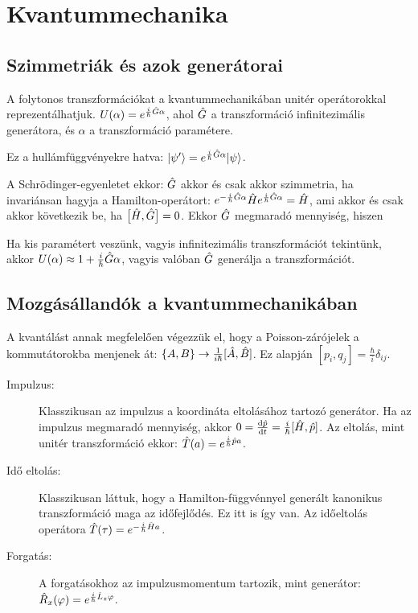 \section{Kvantummechanika}
   
  \subsection{Szimmetriák és azok generátorai}
   
   A folytonos transzformációkat a kvantummechanikában unitér operátorokkal reprezentálhatjuk. $U(\alpha)=e^{\frac{i}{\hbar}\hat{G}\alpha}$, ahol $\hat{G}$ a transzformáció infinitezimális generátora, és $\alpha$ a transzformáció paramétere. 
   
   Ez a hullámfüggvényekre hatva: $\lvert\psi'\rangle=e^{\frac{i}{\hbar}\hat{G}\alpha}\lvert\psi\rangle$. 
   
   A Schrödinger-egyenletet ekkor:
   $\hat{G}$ akkor és csak akkor szimmetria, ha invariánsan hagyja a Hamilton-operátort: $e^{-\frac{i}{\hbar}\hat{G}\alpha}\hat{H} e^{\frac{i}{\hbar}\hat{G}\alpha}=\hat{H}$, ami akkor és csak akkor következik be, ha $\big[\hat{H},\hat{G}\big]=0$. Ekkor $\hat{G}$ megmaradó mennyiség, hiszen
   
   Ha kis paramétert veszünk, vagyis infinitezimális transzformációt tekintünk, akkor $U(\alpha)\approx 1+\frac{i}{\hbar}\hat{G}\alpha$, vagyis valóban $\hat{G}$ generálja a transzformációt. 
   
  \subsection{Mozgásállandók a kvantummechanikában}
   A kvantálást annak megfelelően végezzük el, hogy a Poisson-zárójelek a kommutátorokba menjenek át: $\{A,B\}\to \frac{1}{i\hbar}[\hat{A},\hat{B}]$. Ez alapján $[p_i,q_j]=\frac{\hbar}{i}\delta_{ij}$.
   \begin{description}
    \item[Impulzus:] Klasszikusan az impulzus a koordináta eltolásához tartozó generátor. Ha az impulzus megmaradó mennyiség, akkor $0=\frac{\mathrm{d} \hat{p}}{\mathrm{d} t}=\frac{i}{\hbar}[\hat{H},\hat{p}]$. Az eltolás, mint unitér transzformáció ekkor: $\hat{T}(a)=e^{\frac{i}{\hbar}\hat{p} a}$.
    \item[Idő eltolás:] Klasszikusan láttuk, hogy a Hamilton-függvénnyel generált kanonikus transzformáció maga az időfejlődés. Ez itt is így van. Az időeltolás operátora $\hat{T}(\tau)=e^{-\frac{i}{\hbar}\hat{H} a}$.
    \item[Forgatás:] A forgatásokhoz az impulzusmomentum tartozik, mint generátor: $\hat{R}_x(\varphi)=e^{\frac{i}{\hbar}\hat{L}_z \varphi}$.
   \end{description}

   
   